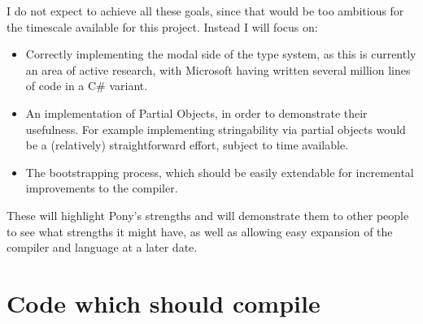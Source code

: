 \documentclass[pdftex,11pt,a4paper]{report}
\begin{document}
I do not expect to achieve all these goals, since that would be too ambitious for the timescale available for this project.
Instead I will focus on:
\begin{itemize}
\item Correctly implementing the modal side of the type system, as	this is currently an area of active research, with Microsoft having written several million lines of code in a C\# variant\cite{microsoft2012}.
\item An implementation of Partial Objects, in order to demonstrate their usefulness.
	For example implementing stringability via partial objects would be a (relatively) straightforward effort, subject to time available.
\item The bootstrapping process, which should be easily extendable for incremental improvements to the compiler.
\end{itemize}

These will highlight Pony's strengths and will demonstrate them to other people to see what strengths it might have, as well as allowing easy expansion of the compiler and language at a later date.

\section{Code which should compile}
\end{document}
